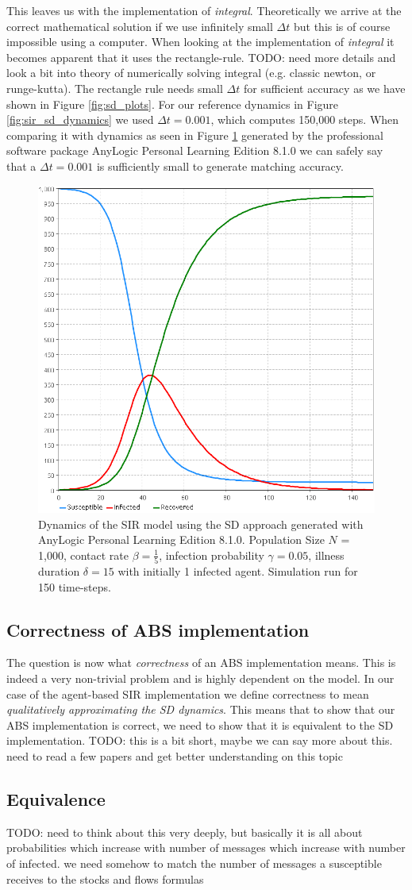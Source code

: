 This leaves us with the implementation of \textit{integral}. Theoretically we arrive at the correct mathematical solution if we use infinitely small $\Delta t$ but this is of course impossible using a computer. When looking at the implementation of \textit{integral} it becomes apparent that it uses the rectangle-rule. TODO: need more details and look a bit into theory of numerically solving integral (e.g. classic newton, or runge-kutta). The rectangle rule needs small $\Delta t$ for sufficient accuracy as we have shown in Figure \ref{fig:sd_plots}.
For our reference dynamics in Figure \ref{fig:sir_sd_dynamics} we used $\Delta t = 0.001$, which computes 150,000 steps. When comparing it with dynamics as seen in Figure \ref{fig:sd_anylogic} generated by the professional software package AnyLogic Personal Learning Edition 8.1.0 we can safely say that a $\Delta t = 0.001$ is sufficiently small to generate matching accuracy.

\begin{figure}
	\centering
	\includegraphics[width=.4\textwidth, angle=0]{./../shared/fig/anylogic/SIR_SD_DYNAMICS_ANYLOGIC.png}
	\caption{Dynamics of the SIR model using the SD approach generated with AnyLogic Personal Learning Edition 8.1.0. Population Size $N$ = 1,000, contact rate $\beta =  \frac{1}{5}$, infection probability $\gamma = 0.05$, illness duration $\delta = 15$ with initially 1 infected agent. Simulation run for 150 time-steps.}
	\label{fig:sd_anylogic}
\end{figure}

\subsection{Correctness of ABS implementation}
The question is now what \textit{correctness} of an ABS implementation means. This is indeed a very non-trivial problem and is highly dependent on the model. In our case of the agent-based SIR implementation we define correctness to mean \textit{qualitatively approximating the SD dynamics}. This means that to show that our ABS implementation is correct, we need to show that it is equivalent to the SD implementation. TODO: this is a bit short, maybe we can say more about this. need to read a few papers and get better understanding on this topic

\subsection{Equivalence}
TODO: need to think about this very deeply, but basically it is all about probabilities which increase with number of messages which increase with number of infected. we need somehow to match the number of messages a susceptible receives to the stocks and flows formulas